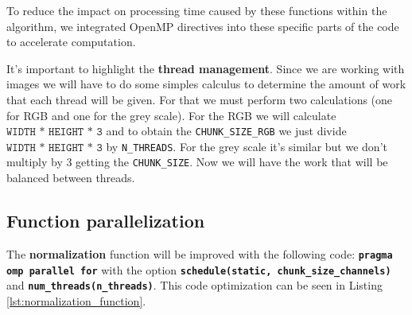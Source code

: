 \documentclass[sigconf]{acmart}
\begin{document}
 To reduce the impact on processing time caused by these functions within the algorithm, we integrated OpenMP directives into these specific parts of the code to accelerate computation.
 
 It's important to highlight the \textbf{thread management}. Since we are working with images we will have to do some simples calculus to determine the amount of work that
 each thread will be given. For that we must perform two calculations (one for RGB and one for the grey scale). For the RGB  we will calculate $\texttt{WIDTH * HEIGHT * 3}$ and to obtain the \texttt{CHUNK\_SIZE\_RGB} we just divide $\texttt{WIDTH * HEIGHT * 3}$  by \texttt{N\_THREADS}. For the grey scale it's similar but we don't multiply by 3 getting the \texttt{CHUNK\_SIZE}. Now we will have the work that will be balanced between threads.
 
\subsection{\textbf{Function parallelization}}

The \textbf{normalization} function will be improved with the following code: \texttt{\textbf{pragma omp parallel for}} with the option \texttt{\textbf{schedule(static, chunk\_size\_channels)}} and \texttt{\textbf{num\_threads(n\_threads)}}. This code optimization can be seen in Listing \ref{lst:normalization_function}.
\end{document}

